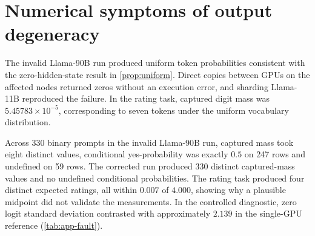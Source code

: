 \section{Numerical symptoms of output degeneracy}\label{app:fault-degeneracy}

The invalid Llama-90B run produced uniform token probabilities consistent
with the zero-hidden-state result in \cref{prop:uniform}.
Direct copies between GPUs on the affected nodes returned zeros without
an execution error, and sharding Llama-11B reproduced the failure.
In the rating task, captured digit mass was $5.45783\times10^{-5}$,
corresponding to seven tokens under the uniform vocabulary distribution.

Across 330 binary prompts in the invalid Llama-90B run, captured mass took
eight distinct values, conditional yes-probability was exactly $0.5$ on
247 rows and undefined on 59 rows. The corrected run produced 330 distinct
captured-mass values and no undefined conditional probabilities.
The rating task produced four distinct expected ratings, all within
$0.007$ of $4.000$, showing why a plausible midpoint did not validate
the measurements. In the controlled diagnostic, zero logit standard
deviation contrasted with approximately $2.139$ in the single-GPU reference
(\cref{tab:app-fault}).
